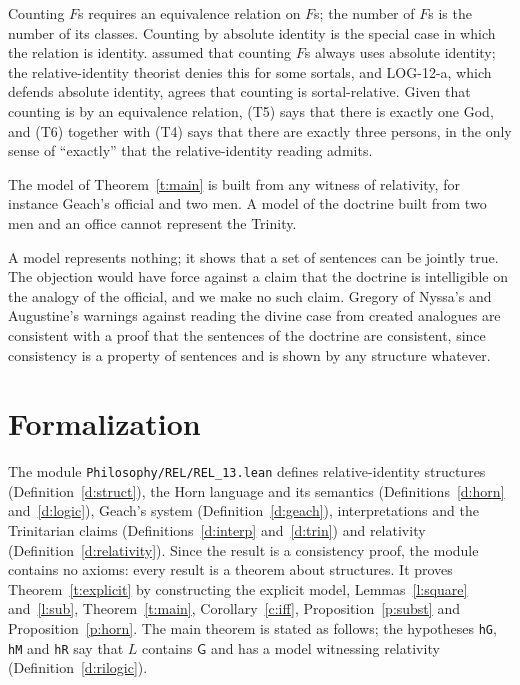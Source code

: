 \documentclass{situationist-preprint}
\begin{document}
\begin{reply}
Counting $F$s requires an equivalence relation on $F$s; the number of $F$s is the number of its classes. Counting by absolute identity is the special case in which the relation is identity. \citet{Cartwright1987} assumed that counting $F$s always uses absolute identity; the relative-identity theorist denies this for some sortals, and LOG-12-a, which defends absolute identity, agrees that counting is sortal-relative. Given that counting is by an equivalence relation, (T5) says that there is exactly one God, and (T6) together with (T4) says that there are exactly three persons, in the only sense of \enquote{exactly} that the relative-identity reading admits.
\end{reply}

\begin{objection}
The model of Theorem~\ref{t:main} is built from any witness of relativity, for instance Geach's official and two men. A model of the doctrine built from two men and an office cannot represent the Trinity.
\end{objection}

\begin{reply}
A model represents nothing; it shows that a set of sentences can be jointly true. The objection would have force against a claim that the doctrine is intelligible on the analogy of the official, and we make no such claim. Gregory of Nyssa's and Augustine's warnings against reading the divine case from created analogues are consistent with a proof that the sentences of the doctrine are consistent, since consistency is a property of sentences and is shown by any structure whatever.
\end{reply}

\section{Formalization}

The module \nolinkurl{Philosophy/REL/REL_13.lean} defines relative-identity structures (Definition~\ref{d:struct}), the Horn language and its semantics (Definitions~\ref{d:horn} and~\ref{d:logic}), Geach's system (Definition~\ref{d:geach}), interpretations and the Trinitarian claims (Definitions~\ref{d:interp} and~\ref{d:trin}) and relativity (Definition~\ref{d:relativity}). Since the result is a consistency proof, the module contains no axioms: every result is a theorem about structures. It proves Theorem~\ref{t:explicit} by constructing the explicit model, Lemmas~\ref{l:square} and~\ref{l:sub}, Theorem~\ref{t:main}, Corollary~\ref{c:iff}, Proposition~\ref{p:subst} and Proposition~\ref{p:horn}. The main theorem is stated as follows; the hypotheses \texttt{hG}, \texttt{hM} and \texttt{hR} say that $L$ contains $\mathsf{G}$ and has a model witnessing relativity (Definition~\ref{d:rilogic}).
\end{document}
